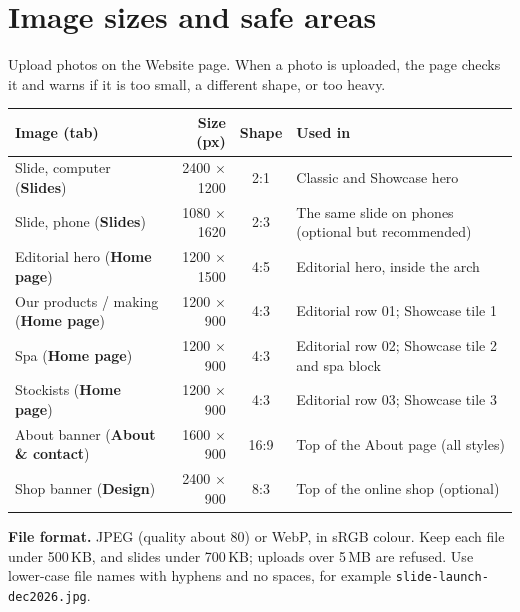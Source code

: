 \documentclass[11pt,a4paper]{article}
\newcommand{\key}[1]{\texttt{#1}}
\newcommand{\tab}[1]{\textsf{\textbf{#1}}}
\begin{document}
\section{Image sizes and safe areas}\label{sec:images}
Upload photos on the Website page. When a photo is uploaded, the page checks it and warns if it is too small, a different shape, or too heavy.

\begin{tabularx}{\textwidth}{@{}l r c L@{}}
\toprule
\textbf{Image (tab)} & \textbf{Size (px)} & \textbf{Shape} & \textbf{Used in} \\ \midrule
Slide, computer (\tab{Slides}) & 2400 × 1200 & 2:1 & Classic and Showcase hero \\
Slide, phone (\tab{Slides}) & 1080 × 1620 & 2:3 & The same slide on phones (optional but recommended) \\
Editorial hero (\tab{Home page}) & 1200 × 1500 & 4:5 & Editorial hero, inside the arch \\
Our products / making (\tab{Home page}) & 1200 × 900 & 4:3 & Editorial row 01; Showcase tile 1 \\
Spa (\tab{Home page}) & 1200 × 900 & 4:3 & Editorial row 02; Showcase tile 2 and spa block \\
Stockists (\tab{Home page}) & 1200 × 900 & 4:3 & Editorial row 03; Showcase tile 3 \\
About banner (\tab{About \& contact}) & 1600 × 900 & 16:9 & Top of the About page (all styles) \\
Shop banner (\tab{Design}) & 2400 × 900 & 8:3 & Top of the online shop (optional) \\ \bottomrule
\end{tabularx}

\textbf{File format.} JPEG (quality about 80) or WebP, in sRGB colour. Keep each file under 500\,KB, and slides under 700\,KB; uploads over 5\,MB are refused. Use lower-case file names with hyphens and no spaces, for example \key{slide-launch-dec2026.jpg}.
\end{document}
